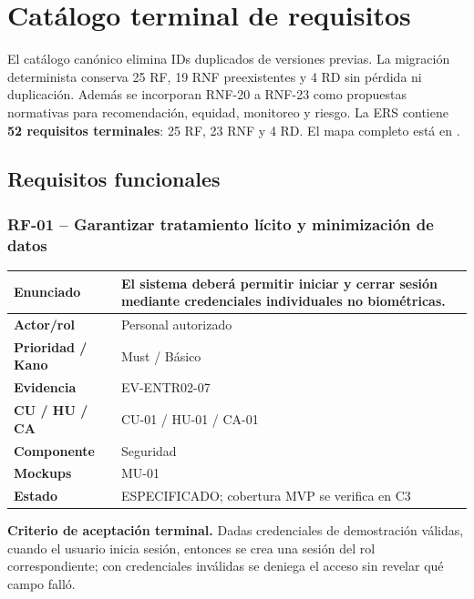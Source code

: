 \documentclass[11pt,a4paper,twoside]{article}
\begin{document}
\section{Catálogo terminal de requisitos}
El catálogo canónico elimina IDs duplicados de versiones previas. La migración determinista conserva 25 RF, 19 RNF preexistentes y 4 RD sin pérdida ni duplicación. Además se incorporan RNF-20 a RNF-23 como propuestas normativas para recomendación, equidad, monitoreo y riesgo. La ERS contiene \textbf{52 requisitos terminales}: 25 RF, 23 RNF y 4 RD. El mapa completo está en .

\subsection{Requisitos funcionales}
\subsubsection{RF-01 -- Garantizar tratamiento lícito y minimización de datos}
\begin{tabularx}{\textwidth}{|>{\bfseries}p{3.2cm}|X|}\hline
Enunciado & El sistema deberá permitir iniciar y cerrar sesión mediante credenciales individuales no biométricas. \\ \hline
Actor/rol & Personal autorizado \\ \hline
Prioridad / Kano & Must / Básico \\ \hline
Evidencia & EV-ENTR02-07 \\ \hline
CU / HU / CA & CU-01 / HU-01 / CA-01 \\ \hline
Componente & Seguridad \\ \hline
Mockups & MU-01 \\ \hline
Estado & ESPECIFICADO; cobertura MVP se verifica en C3 \\ \hline
\end{tabularx}
\textbf{Criterio de aceptación terminal.} Dadas credenciales de demostración válidas, cuando el usuario inicia sesión, entonces se crea una sesión del rol correspondiente; con credenciales inválidas se deniega el acceso sin revelar qué campo falló.
\end{document}

